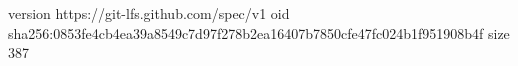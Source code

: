 version https://git-lfs.github.com/spec/v1
oid sha256:0853fe4cb4ea39a8549c7d97f278b2ea16407b7850cfe47fc024b1f951908b4f
size 387
